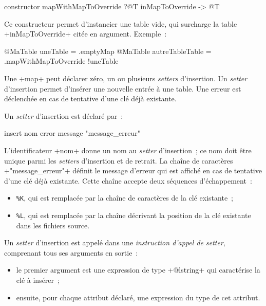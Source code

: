 \begin{galgas3}
constructor mapWithMapToOverride ?@T inMapToOverride -> @T
\end{galgas3}

Ce constructeur permet d'instancier une table vide, qui surcharge la table \ggst+inMapToOverride+ citée en argument. Exemple~:
\begin{galgas3}
@MaTable uneTable = .emptyMap
@MaTable autreTableTable = .mapWithMapToOverride {!uneTable}
\end{galgas3}







Une \ggst+map+ peut déclarer zéro, un ou plusieurs \emph{setters} d'insertion. Un \emph{setter} d'insertion permet d'insérer une nouvelle entrée à une table. Une erreur est déclenchée en cas de tentative d'une clé déjà existante.


Un \emph{setter} d'insertion est déclaré par~:

\begin{galgas3}
insert nom error message "message_erreur"
\end{galgas3}

\begin{galgas4}
\end{galgas4}

L'identificateur \ggst+nom+ donne un nom au \emph{setter} d'insertion~; ce nom doit être unique parmi les \emph{setters} d'insertion et de retrait. La chaîne de caractères \ggst+"message_erreur"+ définit le message d'erreur qui est affiché en cas de tentative d'une clé déjà existante. Cette chaîne accepte deux séquences d'échappement~:
\begin{itemize}
  \item \texttt{\%K}, qui est remplacée par la chaîne de caractères de la clé existante~;
  \item \texttt{\%L}, qui est remplacée par la chaîne décrivant la position de la clé existante dans les fichiers source.
\end{itemize}


Un \emph{setter} d'insertion est appelé dans une \emph{instruction d'appel de setter}, comprenant tous ses arguments en sortie~:
\begin{itemize}
  \item le premier argument est une expression de type \ggst+@lstring+ qui caractérise la clé à insérer~;
  \item ensuite, pour chaque attribut déclaré, une expression du type de cet attribut.
\end{itemize}

